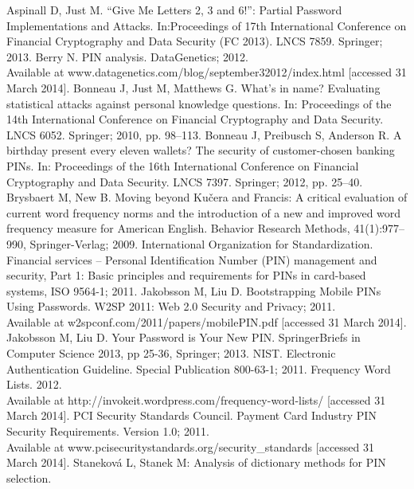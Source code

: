 \documentclass[a4paper, 11pt]{article}
\begin{document}
\begin{thebibliography}{99}
 Aspinall D, Just M. 
  ``Give Me Letters 2, 3 and 6!'': Partial Password Implementations and Attacks. In:Proceedings of 17th 
  International Conference on Financial Cryptography and Data Security (FC 2013). LNCS 7859. 
  Springer; 2013. 
 Berry N. PIN analysis. DataGenetics; 2012. \\
  Available at www.datagenetics.com/blog/september32012/index.html [accessed 31 March 2014].
 Bonneau J, Just M, Matthews G.
  What's in name? Evaluating statistical attacks against personal knowledge questions.
  In: Proceedings of the 14th International Conference on Financial Cryptography and Data Security.
  LNCS 6052. Springer; 2010, pp. 98--113.
 Bonneau J, Preibusch S, Anderson R.
  A birthday present every eleven wallets? The security of customer-chosen banking PINs.
  In: Proceedings of the 16th International Conference on Financial Cryptography and Data Security.
  LNCS 7397. Springer; 2012, pp. 25--40.
 Brysbaert M, New B.
  Moving beyond Kučera and Francis: A critical evaluation of current word frequency norms and the introduction 
  of a new and improved word frequency measure for American English. Behavior Research Methods, 41(1):977--990,
  Springer-Verlag; 2009.
  International Organization for Standardization. 
  Financial services -- Personal Identification  Number (PIN) management and security,
  Part 1: Basic principles and requirements for PINs in card-based systems,  ISO 9564-1; 2011.
 Jakobsson M, Liu D. Bootstrapping Mobile PINs Using Passwords.
  W2SP 2011: Web 2.0 Security and Privacy; 2011. \\
  Available at w2spconf.com/2011/papers/mobilePIN.pdf [accessed 31 March 2014].
 Jakobsson M, Liu D. Your Password is Your New PIN.
  SpringerBriefs in Computer Science 2013, pp 25-36, Springer; 2013.
 NIST. Electronic Authentication Guideline. Special Publication 800-63-1; 2011.
 Frequency Word Lists. 2012. \\
  Available at http://invokeit.wordpress.com/frequency-word-lists/ [accessed 31 March 2014].
 PCI Security Standards Council. Payment Card Industry PIN Security Requirements. 
  Version 1.0; 2011. \\
  Available at www.pcisecuritystandards.org/security\_standards [accessed 31 March 2014].
 Staneková L, Stanek M: Analysis of dictionary methods for PIN selection. 

\end{thebibliography}
\end{document}
